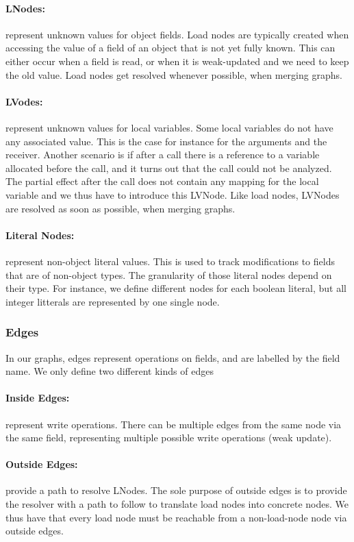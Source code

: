 \documentclass[a4paper]{article}
\begin{document}
\paragraph{LNodes:} represent unknown values for object fields. Load nodes are
typically created when accessing the value of a field of an object that is not
yet fully known. This can either occur when a field is read, or when it is
weak-updated and we need to keep the old value. Load nodes get resolved
whenever possible, when merging graphs.

\paragraph{LVodes:} represent unknown values for local variables. Some local
variables do not have any associated value. This is the case for instance for
the arguments and the receiver. Another scenario is if after a call there is a
reference to a variable allocated before the call, and it turns out that the
call could not be analyzed. The partial effect after the call does not contain
any mapping for the local variable and we thus have to introduce this LVNode.
Like load nodes, LVNodes are resolved as soon as possible, when merging
graphs.

\paragraph{Literal Nodes:} represent non-object literal values. This is used to
track modifications to fields that are of non-object types. The granularity of
those literal nodes depend on their type. For instance, we define different
nodes for each boolean literal, but all integer litterals are represented by one
single node.

\subsubsection{Edges}
In our graphs, edges represent operations on fields, and are labelled by the
field name. We only define two different kinds of edges

\paragraph{Inside Edges:} represent write operations. There can be multiple
edges from the same node via the same field, representing multiple possible
write operations (weak update).

\paragraph{Outside Edges:} provide a path to resolve LNodes. The sole purpose
of outside edges is to provide the resolver with a path to follow to translate
load nodes into concrete nodes. We thus have that every load node must be
reachable from a non-load-node node via outside edges.
\end{document}
